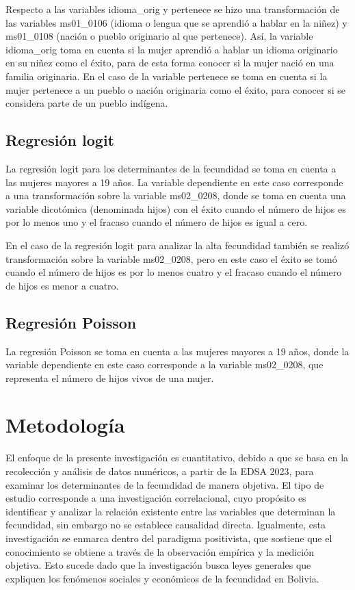 \documentclass[Royal,times,sageh]{sagej}
\begin{document}
Respecto a las variables idioma\_orig y pertenece se hizo una
transformación de las variables ms01\_0106 (idioma o lengua que se
aprendió a hablar en la niñez) y ms01\_0108 (nación o pueblo originario
al que pertenece). Así, la variable idioma\_orig toma en cuenta si la
mujer aprendió a hablar un idioma originario en su niñez como el éxito,
para de esta forma conocer si la mujer nació en una familia originaria.
En el caso de la variable pertenece se toma en cuenta si la mujer
pertenece a un pueblo o nación originaria como el éxito, para conocer si
se considera parte de un pueblo indígena.

\subsection{Regresión logit}\label{regresiuxf3n-logit}

La regresión logit para los determinantes de la fecundidad se toma en
cuenta a las mujeres mayores a 19 años. La variable dependiente en este
caso corresponde a una transformación sobre la variable ms02\_0208,
donde se toma en cuenta una variable dicotómica (denominada hijos) con
el éxito cuando el número de hijos es por lo menos uno y el fracaso
cuando el número de hijos es igual a cero.

En el caso de la regresión logit para analizar la alta fecundidad
también se realizó transformación sobre la variable ms02\_0208, pero en
este caso el éxito se tomó cuando el número de hijos es por lo menos
cuatro y el fracaso cuando el número de hijos es menor a cuatro.

\subsection{Regresión Poisson}\label{regresiuxf3n-poisson-1}

La regresión Poisson se toma en cuenta a las mujeres mayores a 19 años,
donde la variable dependiente en este caso corresponde a la variable
ms02\_0208, que representa el número de hijos vivos de una mujer.

\section{Metodología}\label{metodologuxeda}

El enfoque de la presente investigación es cuantitativo, debido a que se
basa en la recolección y análisis de datos numéricos, a partir de la
EDSA 2023, para examinar los determinantes de la fecundidad de manera
objetiva. El tipo de estudio corresponde a una investigación
correlacional, cuyo propósito es identificar y analizar la relación
existente entre las variables que determinan la fecundidad, sin embargo
no se establece causalidad directa. Igualmente, esta investigación se
enmarca dentro del paradigma positivista, que sostiene que el
conocimiento se obtiene a través de la observación empírica y la
medición objetiva. Esto sucede dado que la investigación busca leyes
generales que expliquen los fenómenos sociales y económicos de la
fecundidad en Bolivia.
\end{document}
